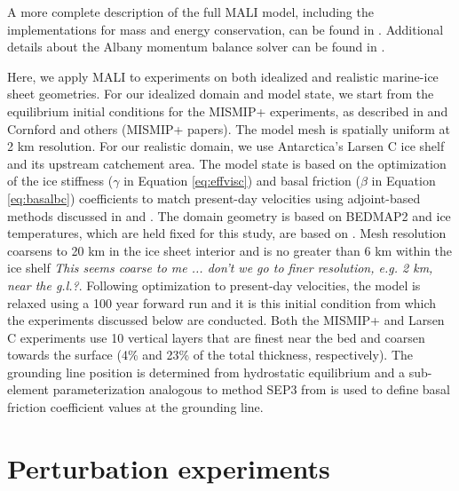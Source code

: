\documentclass[review,oneside]{igs}
\begin{document}
A more complete description of the full MALI model, including the implementations for mass and energy conservation, can be found in \cite{hoffman2018}. Additional details about the Albany momentum balance solver can be found in \cite{tezaur2015a,tezaur2015b}. 

Here, we apply MALI to experiments on both idealized and realistic marine-ice sheet geometries. For our idealized domain and model state, we start from the equilibrium initial conditions for the MISMIP+ experiments, as described in \cite{asay2016} and Cornford and others (MISMIP+ papers). The model mesh is spatially uniform at 2 km resolution. For our realistic domain, we use Antarctica's Larsen C ice shelf and its upstream catchement area. The model state is based on the optimization of the ice stiffness ($\gamma$ in Equation \ref{eq:effvisc}) and basal friction ($\beta$ in Equation \ref{eq:basalbc}) coefficients to match present-day velocities \citep{rignot2014} using adjoint-based methods discussed in \cite{hoffman2018} and \cite{perego2014}. The domain geometry is based on BEDMAP2 \citep{fretwell2013} and ice temperatures, which are held fixed for this study, are based on \cite{liefferinge2013}. Mesh resolution coarsens to 20 km in the ice sheet interior and is no greater than 6 km within the ice shelf \textit{This seems coarse to me ... don't we go to finer resolution, e.g. 2 km, near the g.l.?}. Following optimization to present-day velocities, the model is relaxed using a 100 year forward run and it is this initial condition from which the experiments discussed below are conducted. Both the MISMIP+ and Larsen C experiments use 10 vertical layers that are finest near the bed and coarsen towards the surface (4\% and 23\% of the total thickness, respectively). The grounding line position is determined from hydrostatic equilibrium and a sub-element parameterization analogous to method SEP3 from \cite{seroussi2014} is used to define basal friction coefficient values at the grounding line. 


\section{Perturbation experiments}
\end{document}
